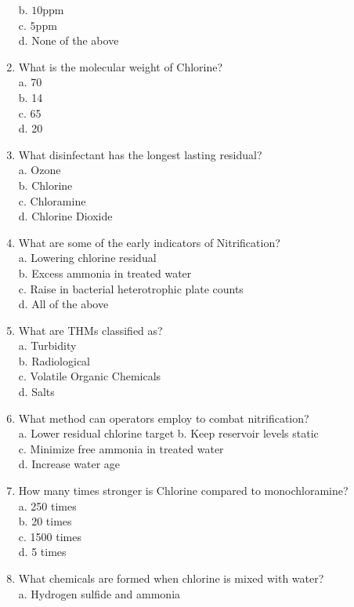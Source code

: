 \begin{enumerate}[1.]
b. $10 \mathrm{ppm}$\\
c. $5 \mathrm{ppm}$\\
d. None of the above\\
\item What is the molecular weight of Chlorine?\\
a. 70\\
b. 14\\
c. 65\\
d. 20\\
\item What disinfectant has the longest lasting residual?\\
a. Ozone\\
b. Chlorine\\
c. Chloramine\\
d. Chlorine Dioxide\\
\item What are some of the early indicators of Nitrification?\\
a. Lowering chlorine residual\\
b. Excess ammonia in treated water\\
c. Raise in bacterial heterotrophic plate counts\\
d. All of the above\\
\item What are THMs classified as?\\
a. Turbidity\\
b. Radiological\\
c. Volatile Organic Chemicals\\
d. Salts\\
\item What method can operators employ to combat nitrification?\\
a. Lower residual chlorine target b. Keep reservoir levels static\\
c. Minimize free ammonia in treated water\\
d. Increase water age\\
\item How many times stronger is Chlorine compared to monochloramine?\\
a. 250 times\\
b. 20 times\\
c. 1500 times\\
d. 5 times\\
\item What chemicals are formed when chlorine is mixed with water?\\
a. Hydrogen sulfide and ammonia\\

\end{enumerate}
